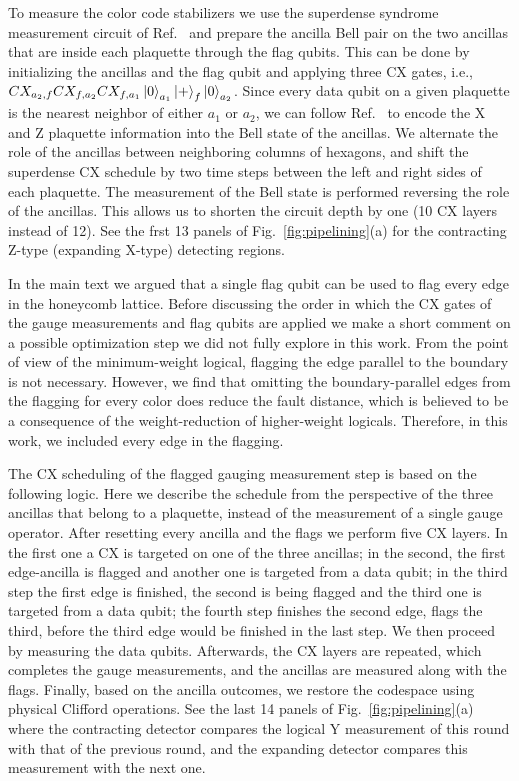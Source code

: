 To measure the color code stabilizers we use the superdense syndrome measurement circuit of Ref.~\cite{gidney_new_2023} and prepare the ancilla Bell pair on the two ancillas that are inside each plaquette through the flag qubits. 
This can be done by initializing the ancillas and the flag qubit and applying three CX gates, i.e., $CX_{a_2,f}CX_{f,a_2}CX_{f,a_1}\ket{0}_{a_1}\ket{+}_f\ket{0}_{a_2}$. 
Since every data qubit on a given plaquette is the nearest neighbor of either $a_1$ or $a_2$, we can follow Ref.~\cite{gidney_new_2023} to encode the X and Z plaquette information into the Bell state of the ancillas. We alternate the role of the ancillas between neighboring columns of hexagons, and shift the superdense CX schedule by two time steps between the left and right sides of each plaquette. The measurement of the Bell state is performed reversing the role of the ancillas. This allows us to shorten the circuit depth by one (10 CX layers instead of 12). See the frst 13 panels of Fig.~\ref{fig:pipelining}(a) for the contracting Z-type (expanding X-type) detecting regions.


In the main text we argued that a single flag qubit can be used to flag every edge in the honeycomb lattice. Before discussing the order in which the CX gates of the gauge measurements and flag qubits are applied we make a short comment on a possible optimization step we did not fully explore in this work. From the point of view of the minimum-weight logical, flagging the edge parallel to the boundary is not necessary. However, we find that omitting the boundary-parallel edges from the flagging for every color does reduce the fault distance, which is believed to be a consequence of the weight-reduction of higher-weight logicals. Therefore, in this work, we included every edge in the flagging.

The CX scheduling of the flagged gauging measurement step is based on the following logic. Here we describe the schedule from the perspective of the three ancillas that belong to a plaquette, instead of the measurement of a single gauge operator. After resetting every ancilla and the flags we perform five CX layers. In the first one a CX is targeted on one of the three ancillas; in the second, the first edge-ancilla is flagged and another one is targeted from a data qubit; in the third step the first edge is finished, the second is being flagged and the third one is targeted from a data qubit; the fourth step finishes the second edge, flags the third, before the third edge would be finished in the last step. We then proceed by measuring the data qubits. Afterwards, the CX layers are repeated, which completes the gauge measurements, and the ancillas are measured along with the flags. Finally, based on the ancilla outcomes, we restore the codespace using physical Clifford operations. See the last 14 panels of Fig.~\ref{fig:pipelining}(a) where the contracting detector compares the logical Y measurement of this round with that of the previous round, and the expanding detector compares this measurement with the next one.

